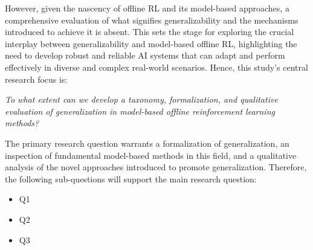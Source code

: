 However, given the nascency of offline RL and its model-based approaches, a comprehensive evaluation of what signifies generalizability and the mechanisms introduced to achieve it is absent. This sets the stage for exploring the crucial interplay between generalizability and model-based offline RL, highlighting the need to develop robust and reliable AI systems that can adapt and perform effectively in diverse and complex real-world scenarios. Hence, this study's central research focus is:

\begin{flushleft}
\textit{To what extent can we develop a taxonomy, formalization, and qualitative evaluation of generalization in model-based offline reinforcement learning methods?}
\end{flushleft}

The primary research question warrants a formalization of generalization, an inspection of fundamental model-based methods in this field, and a qualitative analysis of the novel approaches introduced to promote generalization. Therefore, the following sub-questions will support the main research question:


\begin{itemize}
    \item Q1
    \item Q2
    \item Q3
\end{itemize}
